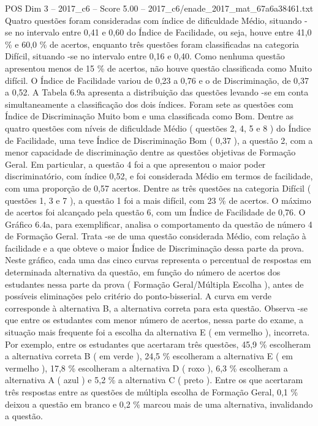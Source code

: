 \begin{textsample}{POS Dim 3 – 2017\_c6 – Score 5.00 – 2017\_c6/enade\_2017\_mat\_67a6a38461.txt}
Quatro questões foram consideradas com índice de dificuldade Médio, situando -se no intervalo entre 0,41 e 0,60 do Índice de Facilidade, ou seja, houve entre 41,0 \% e 60,0 \% de acertos, enquanto três questões foram classificadas na categoria Difícil, situando -se no intervalo entre 0,16 e 0,40.
Como nenhuma questão apresentou menos de 15 \% de acertos, não houve questão classificada como Muito difícil.
O Índice de Facilidade variou de 0,23 a 0,76 e o de Discriminação, de 0,37 a 0,52.
A Tabela 6.9a apresenta a distribuição das questões levando -se em conta simultaneamente a classificação dos dois índices.
Foram sete as questões com Índice de Discriminação Muito bom e uma classificada como Bom.
Dentre as quatro questões com níveis de dificuldade Médio ( questões 2, 4, 5 e 8 ) do Índice de Facilidade, uma teve Índice de Discriminação Bom ( 0,37 ), a questão 2, com a menor capacidade de discriminação dentre as questões objetivas de Formação Geral.
Em particular, a questão 4 foi a que apresentou o maior poder discriminatório, com índice 0,52, e foi considerada Médio em termos de facilidade, com uma proporção de 0,57 acertos.
Dentre as três questões na categoria Difícil ( questões 1, 3 e 7 ), a questão 1 foi a mais difícil, com 23 \% de acertos.
O máximo de acertos foi alcançado pela questão 6, com um Índice de Facilidade de 0,76.
O Gráfico 6.4a, para exemplificar, analisa o comportamento da questão de número 4 de Formação Geral.
Trata -se de uma questão considerada Médio, com relação à facilidade e a que obteve o maior Índice de Discriminação dessa parte da prova.
Neste gráfico, cada uma das cinco curvas representa o percentual de respostas em determinada alternativa da questão, em função do número de acertos dos estudantes nessa parte da prova ( Formação Geral/Múltipla Escolha ), antes de possíveis eliminações pelo critério do ponto-bisserial.
A curva em verde corresponde à alternativa B, a alternativa correta para esta questão.
Observa -se que entre os estudantes com menor número de acertos, nessa parte do exame, a situação mais frequente foi a escolha da alternativa E ( em vermelho ), incorreta.
Por exemplo, entre os estudantes que acertaram três questões, 45,9 \% escolheram a alternativa correta B ( em verde ), 24,5 \% escolheram a alternativa E ( em vermelho ), 17,8 \% escolheram a alternativa D ( roxo ), 6,3 \% escolheram a alternativa A ( azul ) e 5,2 \% a alternativa C ( preto ).
Entre os que acertaram três respostas entre as questões de múltipla escolha de Formação Geral, 0,1 \% deixou a questão em branco e 0,2 \% marcou mais de uma alternativa, invalidando a questão.

\end{textsample}
